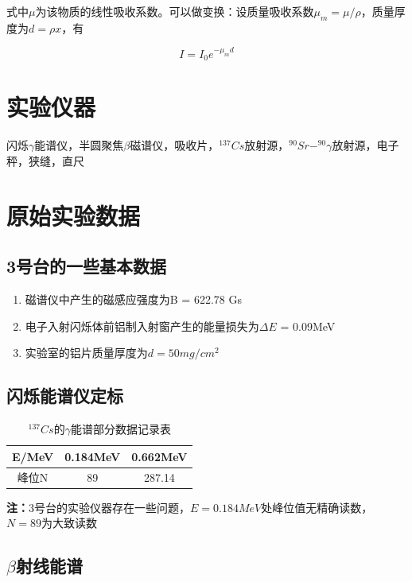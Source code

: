 \documentclass[a4paper,UTF8]{ctexart}
\begin{document}
式中$\mu$为该物质的线性吸收系数。可以做变换：设质量吸收系数$\mu_{m}=\mu / \rho$，质量厚度为$d = \rho x$，有

\begin{equation}
    I = I_0 e^{-\mu_{m}d}
\end{equation}

\section{实验仪器}

闪烁$\gamma$能谱仪，半圆聚焦$\beta$磁谱仪，吸收片，$^{137}Cs$放射源，$^{90}Sr-^{90}\gamma$放射源，电子秤，狭缝，直尺

\section{原始实验数据}

\subsection{3号台的一些基本数据}

\begin{enumerate}
    \item 磁谱仪中产生的磁感应强度为B = 622.78 Gs
    \item 电子入射闪烁体前铝制入射窗产生的能量损失为$\Delta E$ = 0.09MeV
    \item 实验室的铝片质量厚度为$d = 50mg/cm^2$
\end{enumerate}

\subsection{闪烁能谱仪定标}

\begin{table}[H]
    \centering
    \begin{tabular}{|c|c|c|}
    \hline
        E/MeV & 0.184MeV & 0.662MeV \\ \hline
        峰位N & 89 & 287.14 \\ \hline
    \end{tabular}
    \caption{$^{137}Cs$的$\gamma$能谱部分数据记录表}
\end{table}

{\bfseries 注：}3号台的实验仪器存在一些问题，$E = 0.184MeV$处峰位值无精确读数，$N=89$为大致读数

\subsection{$\beta$射线能谱}
\end{document}
